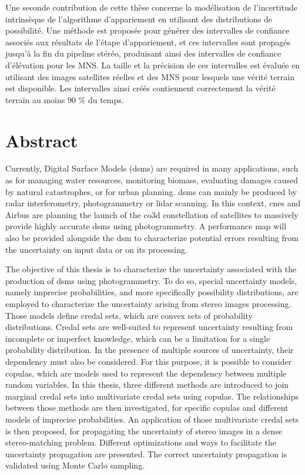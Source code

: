 Une seconde contribution de cette thèse concerne la modélisation de l'incertitude intrinsèque de l'algorithme d'appariement en utilisant des distributions de possibilité. Une méthode est proposée pour générer des intervalles de confiance associés aux résultats de l'étape d'appariement, et ces intervalles sont propagés jusqu'à la fin du pipeline stéréo, produisant ainsi des intervalles de confiance d'élévation pour les MNS. La taille et la précision de ces intervalles est évaluée en utilisant des images satellites réelles et des MNS pour lesquels une vérité terrain est disponible. Les intervalles ainsi créés contiennent correctement la vérité terrain au moins 90 $\%$ du temps.
\clearpage

\chapter*{Abstract}
Currently, Digital Surface Models (\acrshort{dsm}s) are required in many applications, such as for managing water resources, monitoring biomass, evaluating damages caused by natural catastrophes, or for urban planning. \acrshort{dsm}s can mainly be produced by \acrshort{radar} interferometry, photogrammetry or \acrshort{lidar} scanning. In this context, \acrshort{cnes} and Airbus are planning the launch of the \acrshort{co3d} constellation of satellites to massively provide highly accurate \acrshort{dsm}s using photogrammetry. A performance map will also be provided alongside the \acrshort{dsm} to characterize potential errors resulting from the uncertainty on input data or on its processing.

The objective of this thesis is to characterize the uncertainty associated with the production of \acrshort{dsm}s using photogrammetry. To do so, special uncertainty models, namely imprecise probabilities, and more specifically possibility distributions, are employed to characterize the uncertainty arising from stereo images processing. Those models define credal sets, which are convex sets of probability distributions. Credal sets are well-suited to represent uncertainty resulting from incomplete or imperfect knowledge, which can be a limitation for a single probability distribution. In the presence of multiple sources of uncertainty, their dependency must also be considered. For this purpose, it is possible to consider copulas, which are models used to represent the dependency between multiple random variables. In this thesis, three different methods are introduced to join marginal credal sets into multivariate credal sets using copulas. The relationships between those methods are then investigated, for specific copulas and different models of imprecise probabilities. An application of those multivariate credal sets is then proposed, for propagating the uncertainty of stereo images in a dense stereo-matching problem. Different optimizations and ways to facilitate the uncertainty propagation are presented. The correct uncertainty propagation is validated using Monte Carlo sampling.

